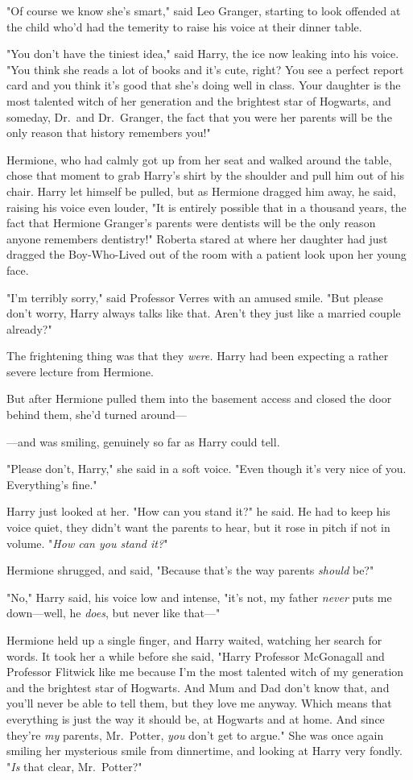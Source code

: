 "Of course we know she's smart," said Leo Granger, starting to look offended at
the child who'd had the temerity to raise his voice at their dinner table.

"You don't have the tiniest idea," said Harry, the ice now leaking into his
voice. "You think she reads a lot of books and it's cute, right? You see a
perfect report card and you think it's good that she's doing well in class.
Your daughter is the most talented witch of her generation and the brightest
star of Hogwarts, and someday, Dr.~and Dr.~Granger, the fact that you were her
parents will be the only reason that history remembers you!"

Hermione, who had calmly got up from her seat and walked around the table,
chose that moment to grab Harry's shirt by the shoulder and pull him out of his
chair. Harry let himself be pulled, but as Hermione dragged him away, he said,
raising his voice even louder, "It is entirely possible that in a thousand
years, the fact that Hermione Granger's parents were dentists will be the only
reason anyone remembers dentistry!"
\sbreak
Roberta stared at where her daughter had just dragged the Boy-Who-Lived out of
the room with a patient look upon her young face.

"I'm terribly sorry," said Professor Verres with an amused smile. "But please
don't worry, Harry always talks like that. Aren't they just like a married
couple already?"

The frightening thing was that they \emph{were.}
\sbreak
Harry had been expecting a rather severe lecture from Hermione.

But after Hermione pulled them into the basement access and closed the door
behind them, she'd turned around—

—and was smiling, genuinely so far as Harry could tell.

"Please don't, Harry," she said in a soft voice. "Even though it's very nice of
you. Everything's fine."

Harry just looked at her. "How can you stand it?" he said. He had to keep his
voice quiet, they didn't want the parents to hear, but it rose in pitch if not
in volume. "\emph{How can you stand it?}"

Hermione shrugged, and said, "Because that's the way parents \emph{should} be?"

"No," Harry said, his voice low and intense, "it's not, my father \emph{never}
puts me down—well, he \emph{does}, but never like that—"

Hermione held up a single finger, and Harry waited, watching her search for
words. It took her a while before she said, "Harry{\el} Professor McGonagall
and Professor Flitwick like me because I'm the most talented witch of my
generation and the brightest star of Hogwarts. And Mum and Dad don't know that,
and you'll never be able to tell them, but they love me anyway. Which means
that everything is just the way it should be, at Hogwarts and at home. And
since they're \emph{my} parents, Mr.~Potter, \emph{you} don't get to argue."
She was once again smiling her mysterious smile from dinnertime, and looking at
Harry very fondly. "\emph{Is} that clear, Mr.~Potter?"

